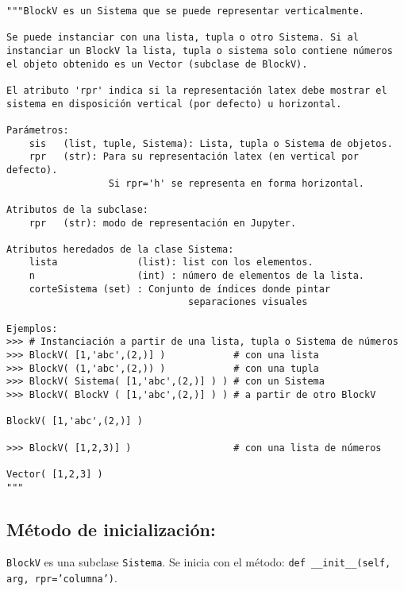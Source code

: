 \documentclass[11pt]{report}
\begin{document}
\begin{verbatim}
"""BlockV es un Sistema que se puede representar verticalmente.

Se puede instanciar con una lista, tupla o otro Sistema. Si al
instanciar un BlockV la lista, tupla o sistema solo contiene números
el objeto obtenido es un Vector (subclase de BlockV).

El atributo 'rpr' indica si la representación latex debe mostrar el
sistema en disposición vertical (por defecto) u horizontal.

Parámetros:
    sis   (list, tuple, Sistema): Lista, tupla o Sistema de objetos.
    rpr   (str): Para su representación latex (en vertical por defecto).
                  Si rpr='h' se representa en forma horizontal. 

Atributos de la subclase:
    rpr   (str): modo de representación en Jupyter.

Atributos heredados de la clase Sistema:
    lista              (list): list con los elementos.
    n                  (int) : número de elementos de la lista.
    corteSistema (set) : Conjunto de índices donde pintar
                                separaciones visuales

Ejemplos:
>>> # Instanciación a partir de una lista, tupla o Sistema de números
>>> BlockV( [1,'abc',(2,)] )            # con una lista
>>> BlockV( (1,'abc',(2,)) )            # con una tupla
>>> BlockV( Sistema( [1,'abc',(2,)] ) ) # con un Sistema
>>> BlockV( BlockV ( [1,'abc',(2,)] ) ) # a partir de otro BlockV

BlockV( [1,'abc',(2,)] )

>>> BlockV( [1,2,3)] )                  # con una lista de números

Vector( [1,2,3] )
"""
\end{verbatim}

\subsection{Método de inicialización:}
\label{sec:org0623b77}

\texttt{BlockV} es una subclase \texttt{Sistema}. Se inicia con el método: \texttt{def
\_\_init\_\_(self, arg, rpr='columna')}.
\end{document}
